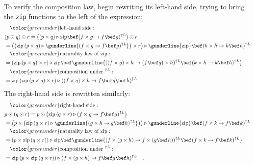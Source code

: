 To verify the composition law, begin rewriting its left-hand side,
trying to bring the \lstinline!zip! functions to the left of the
expression:
\begin{align*}
 & \quad{\color{greenunder}\text{left-hand side}:}\quad\\
 & (p\odot q)\odot r=\big((p\times q)\triangleright\text{zip}\bef(f\times g\rightarrow f\bef g)^{\uparrow L}\big)\odot r\\
 & =\big(\big(\text{zip}\left(p\times q\right)\triangleright\gunderline{(f\times g\rightarrow f\bef g)^{\uparrow L}}\big)\times r\big)\triangleright\gunderline{\text{zip}}\bef(k\times h\rightarrow k\bef h)^{\uparrow L}\\
 & \quad{\color{greenunder}\text{naturality law of }\text{zip}:}\quad\\
 & =(\text{zip}\left(p\times q\right)\times r)\triangleright\text{zip}\bef\gunderline{((f\times g)\times h\rightarrow(f\bef g)\times h)^{\uparrow L}\bef(k\times h\rightarrow k\bef h)^{\uparrow L}}\\
 & \quad{\color{greenunder}\text{composition under }^{\uparrow L}:}\quad\\
 & =\text{zip}\left(\text{zip}\left(p\times q\right)\times r\right)\triangleright((f\times g)\times h\rightarrow f\bef g\bef h)^{\uparrow L}\quad.
\end{align*}
The right-hand side is rewritten similarly:
\begin{align*}
 & \quad{\color{greenunder}\text{right-hand side}:}\quad\\
 & p\odot(q\odot r)=p\odot\big(\text{zip}\left(q\times r\right)\triangleright(f\times g\rightarrow f\bef g)^{\uparrow L}\big)\\
 & =\big(p\times\big(\text{zip}\left(q\times r\right)\triangleright\gunderline{(g\times h\rightarrow g\bef h)^{\uparrow L}}\big)\big)\triangleright\gunderline{\text{zip}}\bef(f\times k\rightarrow f\bef k)^{\uparrow L}\\
 & \quad{\color{greenunder}\text{naturality law of }\text{zip}:}\quad\\
 & =(p\times\text{zip}\left(q\times r\right))\triangleright\text{zip}\bef\gunderline{(f\times(g\times h)\rightarrow f\times(g\bef h))^{\uparrow L}\bef(f\times k\rightarrow f\bef k)^{\uparrow L}}\\
 & \quad{\color{greenunder}\text{composition under }^{\uparrow L}:}\quad\\
 & =\text{zip}\left(p\times\text{zip}\left(q\times r\right)\right)\triangleright(f\times(g\times h)\rightarrow f\bef g\bef h)^{\uparrow L}\quad.
\end{align*}
